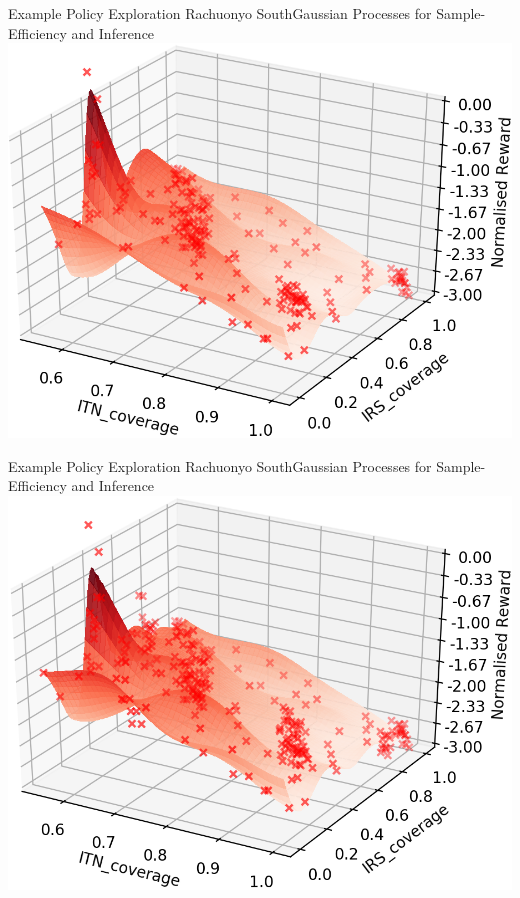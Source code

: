 \documentclass{beamer}
\begin{document}
\begin{frame}{Example Policy Exploration Rachuonyo South}{Gaussian Processes for Sample-Efficiency and Inference}
\centering
\includegraphics[width=1\textheight]{images/Batch_3.png}
\end{frame}
\begin{frame}{Example Policy Exploration Rachuonyo South}{Gaussian Processes for Sample-Efficiency and Inference}
\centering
\includegraphics[width=1\textheight]{images/Batch_4.png}
\end{frame}
\end{document}
